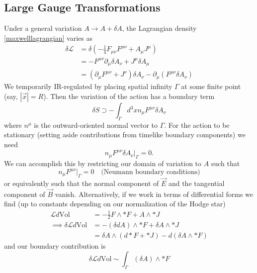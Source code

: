 \documentclass[11pt,letterpaper]{article}
\newcommand{\LP}{\left(}
\newcommand{\RP}{\right)}
\newcommand{\mc}[1]{\mathcal{#1}}
\newcommand{\D}{\partial}
\begin{document}
\subsection{Large Gauge Transformations}
Under a general variation $A \to A + \delta A$, the Lagrangian density \eqref{maxwelllagrangian} varies as \begin{equation}
\begin{aligned}
\delta \mc{L} & = \delta \LP - \frac{1}{4} F_{\mu \nu} F^{\mu \nu} + A_\mu J^\mu \RP \\
& = - F^{\mu \nu} \D_\mu \delta A_\nu + J^\mu \delta A_\mu \\
& = \LP \D_\mu F^{\mu \nu} + J^\nu \RP \delta A_\nu - \D_\mu \LP F^{\mu \nu} \delta A_\nu \RP
\end{aligned}
\end{equation}
We temporarily IR-regulated by placing spatial infinity $\Gamma$ at some finite point (say, $|\vec{x}| = R$). Then the variation of the action has a boundary term \begin{equation}
\delta S \supset - \int_\Gamma d^3 x n_\mu F^{\mu \nu} \delta A_\nu
\end{equation}
where $n^\mu$ is the outward-oriented normal vector to $\Gamma$. For the action to be stationary (setting aside contributions from timelike boundary components) we need \begin{equation}
n_\mu F^{\mu \nu} \delta A_\nu |_\Gamma = 0.
\end{equation}
We can accomplish this by restricting our domain of variation to $A$ such that \begin{equation}
n_\mu F^{\mu \nu} |_\Gamma = 0 \quad \mbox{(Neumann boundary conditions)}
\end{equation}
or equivalently such that the normal component of $\vec{E}$ and the tangential component of $\vec{B}$ vanish. Alternatively, if we work in terms of differential forms we find (up to constants depending on our normalization of the Hodge star) \begin{equation}
\begin{aligned}
\mc{L} d \mbox{Vol} & = - \frac{1}{2} F \wedge * F + A \wedge * J \\
\implies \delta \mc{L} d \mbox{Vol}  & = - (\delta d A) \wedge * F + \delta A \wedge * J \\
& = \delta A \wedge \LP d * F + * J \RP - d \LP \delta A \wedge * F \RP
\end{aligned}
\end{equation}
and our boundary contribution is \begin{equation}
\delta \mc{L} d \mbox{Vol} \sim \int_\Gamma (\delta A) \wedge * F
\end{equation}
\end{document}
